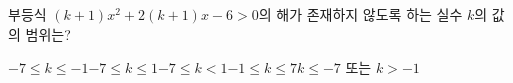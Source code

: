 부등식 $(k+1)x^2+2(k+1)x-6>0$의 해가 존재하지 않도록 하는 실수 $k$의 값의 범위는?
\begin{choicesii}{$-7\le k\le -1$}{$-7\le k\le 1$}{$-7\le k<1$}{$-1\le k\le 7$}{$k\le -7$ 또는 $k>-1$}\end{choicesii}
